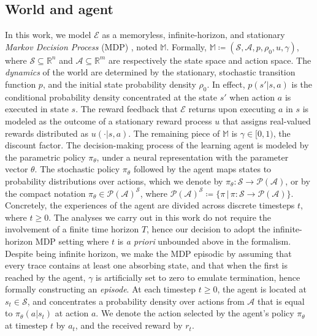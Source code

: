 \subsection*{World and agent}

In this work, we model $\mathcal{E}$ as a memoryless, infinite-horizon, and stationary
\emph{Markov Decision Process} (MDP) \cite{Puterman1994-pf}, noted $\mathbb{M}$.
Formally, $\mathbb{M} \coloneqq (\mathcal{S}, \mathcal{A}, p, \rho_0, u, \gamma)$, where
$\mathcal{S} \subseteq \mathbb{R}^n$ and $\mathcal{A} \subseteq \mathbb{R}^m$
are respectively the state space and action space.
The \emph{dynamics} of the world are determined by the stationary, stochastic transition function $p$, and
the initial state probability density $\rho_0$.
In effect, $p(s' | s, a)$ is the conditional probability density
concentrated at the state $s'$ when action $a$ is executed in state $s$.
The reward feedback that $\mathcal{E}$ returns upon executing $a$ in $s$ is modeled as the outcome of
a stationary reward process $u$ that assigns real-valued rewards
distributed as $u(\cdot | s, a)$.
The remaining piece of $\mathbb{M}$ is $\gamma \in [0, 1)$, the discount factor.
The decision-making process of the learning agent is modeled by the parametric policy $\pi_\theta$,
under a neural representation with the parameter vector $\theta$.
The stochastic policy $\pi_\theta$ followed by the agent
maps states to probability distributions over actions, which we denote by
$\pi_\theta : \mathcal{S} \to \mathcal{P}(\mathcal{A})$, or by the compact notation
$\pi_\theta \in \mathcal{P}(\mathcal{A})^\mathcal{S}$, where
$\mathcal{P}(\mathcal{A})^\mathcal{S}
\coloneqq \{ \pi \, | \, \pi: \mathcal{S} \to \mathcal{P}(\mathcal{A}) \}$.
Concretely, the experiences of the agent are divided across discrete timesteps $t$, where $t\geq0$.
The analyses we carry out in this work do not require the involvement of a finite time horizon $T$,
hence our decision to adopt the infinite-horizon MDP setting
where $t$ is \textit{a priori} unbounded above in the
formalism.
Despite being infinite horizon, we make the MDP episodic
by assuming that every trace contains at least one absorbing state,
and that when the first is reached by the agent, $\gamma$ is artificially set to zero
to emulate termination, hence formally constructing an \textit{episode}.
At each timestep $t\geq0$, the agent is located at $s_t \in \mathcal{S}$,
and concentrates a probability density over actions from $\mathcal{A}$ that is equal to
$\pi_\theta(a | s_t)$ at action $a$.
We denote the action selected by the agent's policy $\pi_\theta$ at timestep $t$ by $a_t$,
and the received reward by $r_t$.

